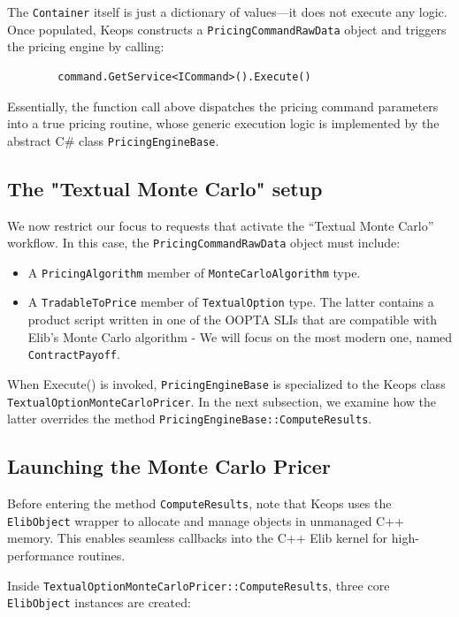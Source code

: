 \documentclass[11pt]{article}
\begin{document}
The \texttt{Container} itself is just a dictionary of values—it does not execute any logic.  Once populated, Keops constructs a \texttt{PricingCommandRawData} object and triggers the pricing engine by calling: 
\begin{center}
    \begin{verbatim}
        command.GetService<ICommand>().Execute()
    \end{verbatim}
\end{center}
Essentially, the function call above dispatches the pricing command parameters into a true pricing routine, whose generic execution logic is implemented by the abstract C\# class \texttt{PricingEngineBase}.

\subsection{The "Textual Monte Carlo" setup}

We now restrict our focus to requests that activate the “Textual Monte Carlo” workflow.  In this case, the \texttt{PricingCommandRawData} object must include:

\begin{itemize}
  \item A \texttt{PricingAlgorithm} member of \texttt{MonteCarloAlgorithm} type.
  \item A \texttt{TradableToPrice} member of \texttt{TextualOption} type.
  The latter contains a product script written in one of the OOPTA SLIs that are compatible with Elib's Monte Carlo algorithm - We will focus on the most modern one, named \texttt{ContractPayoff}.
\end{itemize}

When Execute() is invoked, \texttt{PricingEngineBase} is specialized to the Keops class \texttt{TextualOptionMonteCarloPricer}.  In the next subsection, we examine how the latter overrides the method \texttt{PricingEngineBase::ComputeResults}.

\subsection{Launching the Monte Carlo Pricer}

Before entering the method \texttt{ComputeResults}, note that Keops uses the \texttt{ElibObject} wrapper to allocate and manage objects in unmanaged C++ memory.  This enables seamless callbacks into the C++ Elib kernel for high-performance routines.


Inside \texttt{TextualOptionMonteCarloPricer::ComputeResults}, three core \texttt{ElibObject} instances are created:
\end{document}

